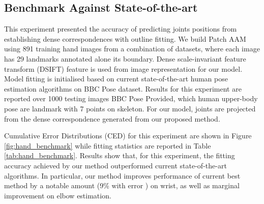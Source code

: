 \subsection{Benchmark Against State-of-the-art}
\label{exp:benchmark}
This experiment presented the accuracy of predicting joints positions from establishing dense correspondences with outline fitting. We build Patch AAM using 891 training hand images from a combination of datasets, where each image has 29 landmarks annotated alone its boundary. Dense scale-invariant feature transform (DSIFT)\cite{PoseletsICCV09} feature is used from image representation for our model. Model fitting is initialised based on current state-of-the-art human pose estimation algorithms on BBC Pose dataset. Results for this experiment are reported over 1000 testing images BBC Pose Provided, which human upper-body pose are landmark with 7 points on skeleton. For our model, joints are projected from the dense correspondence generated from our proposed method. 

Cumulative Error Distributions (CED) for this experiment are shown in Figure \ref{fig:hand_benchmark} while fitting statistics are reported in Table \ref{tab:hand_benchmark}. Results show that, for this experiment, the fitting accuracy achieved by our method outperformed current state-of-the-art algorithms. In particular, our method improves performance of current best method \cite{pfister2015flowing} by a notable amount (9\% with error \leq 6pt) on wrist, as well as marginal improvement on elbow estimation.


